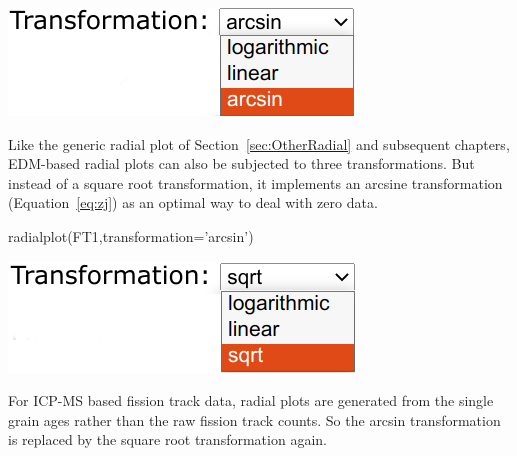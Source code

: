 \begin{refsection}
\noindent\begin{minipage}[t]{.3\linewidth}
\strut\vspace*{-\baselineskip}\newline
\includegraphics[width=\linewidth]{../figures/FTradialTransformations.png}
\end{minipage}
\begin{minipage}[t]{.7\linewidth}
  Like the generic radial plot of Section~\ref{sec:OtherRadial} and
  subsequent chapters, EDM-based radial plots can also be subjected to
  three transformations. But instead of a square root transformation,
  it implements an arcsine transformation (Equation~\ref{eq:zj}) as an
  optimal way to deal with zero data.
\end{minipage}

\begin{console}
radialplot(FT1,transformation='arcsin')
\end{console}

\noindent\begin{minipage}[t]{.3\linewidth}
\strut\vspace*{-\baselineskip}\newline
\includegraphics[width=\linewidth]{../figures/UPbRadialTransformation.png}
\end{minipage}
\begin{minipage}[t]{.7\linewidth}
For ICP-MS based fission track data, radial plots are generated from
the single grain ages rather than the raw fission track counts. So the
arcsin transformation is replaced by the square root transformation
again.
\end{minipage}


\end{refsection}
